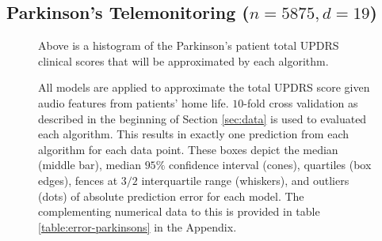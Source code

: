 \documentclass[smallextended,final]{svjour3}       %
\begin{document}
\subsection{Parkinson's Telemonitoring ($n = 5875, d = 19$)}

\begin{figure}
  \centering
  \caption{Above is a histogram of the Parkinson's patient total UPDRS
    clinical scores that will be approximated by each algorithm.}
  \label{fig:hist-parkinsons}
\end{figure}

\begin{figure}
  \centering
  \caption{All models are applied to approximate the total UPDRS score
    given audio features from patients' home life. $10$-fold
    cross validation as described in the beginning of Section
    \ref{sec:data} is used to evaluated each algorithm. This results
    in exactly one prediction from each algorithm for each data
    point. These boxes depict the median (middle bar), median $95\%$
    confidence interval (cones), quartiles (box edges), fences at
    $3/2$ interquartile range (whiskers), and outliers (dots) of
    absolute prediction error for each model. The complementing
    numerical data to this is provided in table
    \ref{table:error-parkinsons} in the Appendix.}
  \label{fig:error-parkinsons}
\end{figure}
\end{document}
